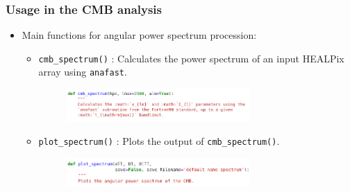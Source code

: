 \begin{frame}
\frametitle{Usage in the CMB analysis}

\begin{itemize}
	\item<1-> Main functions for angular power spectrum procession:
	\begin{itemize}
		\item<1-> \texttt{cmb\_spectrum()} : Calculates the power spectrum of an input HEALPix array using \texttt{anafast}.
		\begin{figure}
			\includegraphics[width=0.7\textwidth]{./images/cmb_spectrum.png}
		\end{figure}
		\item<1-> \texttt{plot\_spectrum()} : Plots the output of \texttt{cmb\_spectrum()}. 
		\begin{figure}
			\includegraphics[width=0.7\textwidth]{./images/plot_spectrum.png}
		\end{figure}
	\end{itemize}
\end{itemize}

\end{frame}